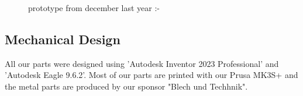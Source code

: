 \documentclass{scrartcl}
\begin{document}
\begin{figure}[!h]
    \begin{center}
    \caption{prototype from december last year :-}
    \label{prototype}
    \end{center}
    \end{figure}

\subsection{Mechanical Design}
All our parts were designed using 'Autodesk Inventor 2023 Professional' and 'Autodesk Eagle 9.6.2'.
Most of our parts are printed with our Prusa MK3S+ and the metal parts are produced
by our sponsor "Blech und Techhnik".
\end{document}
